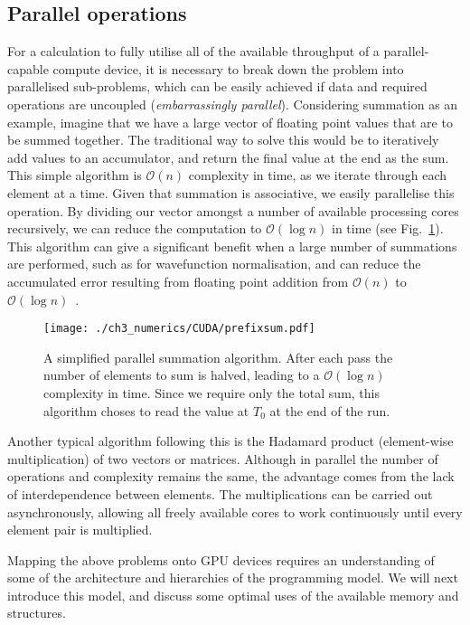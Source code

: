 \subsection{Parallel operations}\label{subsec:par_op}
\label{sub:Parallel operations}
For a calculation to fully utilise all of the available throughput of a parallel-capable compute device, it is necessary to break down the problem into parallelised sub-problems, which can be easily achieved if data and required operations are uncoupled (\textit{embarrassingly parallel}). Considering summation as an example, imagine that we have a large vector of floating point values that are to be summed together. The traditional way to solve this would be to iteratively add values to an accumulator, and return the final value at the end as the sum. This simple algorithm is $\mathcal{O}(n)$ complexity in time, as we iterate through each element at a time. Given that summation is associative, we easily parallelise this operation. By dividing our vector amongst a number of available processing cores recursively, we can reduce the computation to $\mathcal{O}(\log{} n)$ in time (see Fig.~\ref{fig:prefixsum}). This algorithm can give a significant benefit when a large number of summations are performed, such as for wavefunction normalisation, and can reduce the accumulated error resulting from floating point addition from $\mathcal{O}(n)$ to $\mathcal{O}(\log{} n)$~\cite{NUM:Higham_siam_1993}.

\begin{figure}
    \centering
    \texttt{[image: ./ch3\_numerics/CUDA/prefixsum.pdf]}
    \caption{A simplified parallel summation algorithm. After each pass the number of elements to sum is halved, leading to a $\mathcal{O}(\log{} n)$ complexity in time. Since we require only the total sum, this algorithm choses to read the value at $T_0$ at the end of the run.}
    \label{fig:prefixsum}
\end{figure}

Another typical algorithm following this is the Hadamard product (element-wise multiplication) of two vectors or matrices. Although in parallel the number of operations and complexity remains the same, the advantage comes from the lack of interdependence between elements. The multiplications can be carried out asynchronously, allowing all freely available cores to work continuously until every element pair is multiplied.


Mapping the above problems onto GPU devices requires an understanding of some of the architecture and hierarchies of the programming model. We will next introduce this model, and discuss some optimal uses of the available memory and structures.


